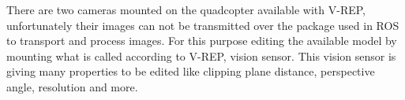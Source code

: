 There are two cameras mounted on the quadcopter available with V-REP, unfortunately their images can not be transmitted over the package used in ROS to transport and process images. For this purpose editing the available model by mounting what is called according to V-REP, vision sensor. This vision sensor is giving many properties to be edited like clipping plane distance, perspective angle, resolution and more. 

  

  



